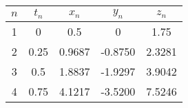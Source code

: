 		\begin{table}[H]
			\centering
			\begin{tabular}{|c|c|c|c|c|}
				\hline
				$n$ & $t_{n}$ & $x_{n}$ & $y_{n}$ & $z_{n}$ \\ \hline
				1 & 0 & 0.5 & 0 & 1.75 \\ \hline
				2 & 0.25 & 0.9687 & -0.8750 & 2.3281 \\ \hline
				3 & 0.5 & 1.8837 & -1.9297 & 3.9042 \\ \hline
				4 & 0.75 & 4.1217 & -3.5200 & 7.5246 \\ \hline
			\end{tabular}
		\end{table}

